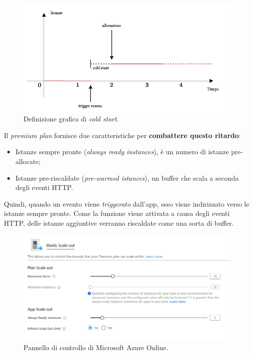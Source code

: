 \documentclass[a4paper]{article}
\begin{document}
	\begin{figure}[!htp]
		\centering
		\includegraphics[width=\textwidth]{img/cold-start.pdf}
		\caption{Definizione grafica di \emph{cold start}.}
	\end{figure}
	
	\noindent
	Il \emph{premium plan} fornisce due caratteristiche per \textbf{combattere questo ritardo}:
	\begin{itemize}
		\item Istanze sempre pronte (\emph{always ready instances}), è un numero di istanze pre-allocate;
		
		\item Istanze pre-riscaldate (\emph{pre-warmed istances}), un buffer che scala a seconda degli eventi HTTP.
	\end{itemize}
	Quindi, quando un evento viene \emph{triggerato} dall'app, esso viene indirizzato verso le istanze sempre pronte. Come la funzione viene attivata a causa degli eventi HTTP, delle istanze aggiuntive verranno riscaldate come una sorta di buffer.\newpage
	
	\begin{figure}[!htp]
		\centering
		\includegraphics[width=\textwidth]{img/scale-out.png}
		\caption{Pannello di controllo di Microsoft Azure Online.}
	\end{figure}
	
\end{document}
